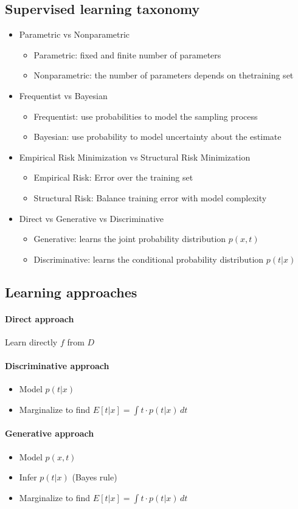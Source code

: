 \documentclass{article}
\begin{document}
\subsection{Supervised learning taxonomy}
\begin{itemize}
\item Parametric vs Nonparametric
\begin{itemize}
	\item Parametric: fixed and finite number of parameters
	\item Nonparametric: the number of parameters depends on thetraining set
\end{itemize}
\item Frequentist vs Bayesian
\begin{itemize}
	\item Frequentist: use probabilities to model the sampling process 
	\item Bayesian: use probability to model uncertainty about the estimate
\end{itemize}
\item Empirical Risk Minimization vs Structural Risk Minimization
\begin{itemize}
	\item Empirical Risk: Error over the training set
	\item Structural Risk: Balance training error with model complexity
\end{itemize}
\item Direct vs Generative vs Discriminative 
\begin{itemize}
	\item Generative: learns the joint probability distribution $p(x,t)$
	\item Discriminative: learns the conditional probability distribution $p(t|x)$
\end{itemize}
\end{itemize}

\subsection{Learning approaches}

\paragraph{Direct approach} Learn directly $f$ from $D$

\paragraph{Discriminative approach}
\begin{itemize}
\item Model $p(t|x)$
\item Marginalize to find ${E[t|x]=\int t\cdot p(t|x)\, dt}$
\end{itemize}

\paragraph{Generative approach}
\begin{itemize}
\item Model $p(x,t)$
\item Infer $p(t|x)$ (Bayes rule)
\item Marginalize to find ${E[t|x]=\int t\cdot p(t|x)\, dt}$
\end{itemize}
\end{document}
